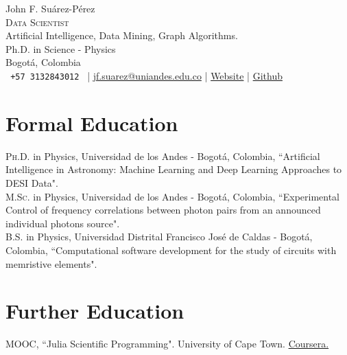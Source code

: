 \documentclass[10pt, a4paper]{article}
\newcommand{\years}[1]{\marginnote{\scriptsize #1}}
\begin{document}
{\LARGE John F. Suárez-Pérez}\\[0.5cm]
\textsc{Data Scientist}\\
Artificial Intelligence, Data Mining, Graph Algorithms.\\

Ph.D. in Science - Physics \\
Bogotá, Colombia\\[.2cm]
\texttt{ +57 3132843012 }
\hspace{0.3cm}|\hspace{0.3cm}
\href{mailto:jf.suarez@uniandes.edu.co}{jf.suarez@uniandes.edu.co}
\hspace{0.3cm}|\hspace{0.3cm}
\href{https://jsuarez314.gitlab.io}{Website}
\hspace{0.3cm}|\hspace{0.3cm}
\href{https://github.com/jsuarez314}{Github}



\section*{Formal Education}
\noindent
\years{2023}\textsc{Ph.D.} in Physics, Universidad de los Andes - Bogotá, Colombia, “Artificial Intelligence in Astronomy: Machine Learning and Deep Learning Approaches to DESI Data".\\

\years{2017}\textsc{M.Sc.} in Physics, Universidad de los Andes - Bogotá, Colombia, “Experimental 
Control of frequency correlations between photon pairs from an announced individual photons 
source".\\

\years{2014}\textsc{B.S.} in Physics, Universidad Distrital Francisco José de Caldas - 
Bogotá, Colombia, “Computational software development for the study of circuits with memristive 
elements".\\


\section*{Further Education}
\noindent
\years{2021}\textsc{MOOC}, “Julia Scientific Programming". University of Cape Town. \href{https://coursera.org/share/faa0fcc877c44d0c38b6a2c4179818f2}{Coursera.}\\
\end{document}
